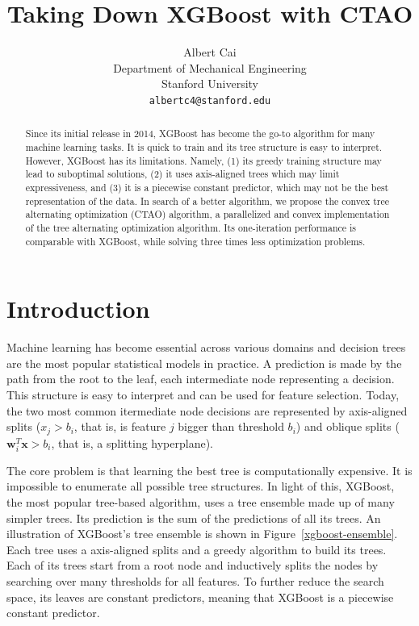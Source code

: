 \documentclass{article}
\title{Taking Down XGBoost with CTAO}
\author{%
  Albert Cai\\
  Department of Mechanical Engineering\\
  Stanford University\\
  \texttt{albertc4@stanford.edu} \\
}
\begin{document}
\maketitle


\begin{abstract}
  Since its initial release in 2014, XGBoost has become the go-to algorithm for many machine learning tasks.
  It is quick to train and its tree structure is easy to interpret. However, XGBoost has its limitations.
  Namely, (1) its greedy training structure may lead to suboptimal solutions, (2) it uses
  axis-aligned trees which may limit expressiveness, and (3) it is a
  piecewise constant predictor, which may not be the best representation of the data.
  In search of a better algorithm, we propose the convex tree alternating optimization (CTAO) algorithm, 
  a parallelized and convex implementation of the tree alternating optimization algorithm.
  Its one-iteration performance is comparable with XGBoost, while solving three times less optimization problems.
\end{abstract}


\section{Introduction}

Machine learning has become essential across various domains and decision trees are the most popular statistical models in practice.
A prediction is made by the path from the root to the leaf, each intermediate node representing a decision. 
This structure is easy to interpret and can be used for feature selection.
Today, the two most common itermediate node decisions are represented by 
axis-aligned splits ($x_j > b_i$, that is, is feature $j$ bigger than threshold $b_i$) and
oblique splits ($\mathbf{w}_i^T\mathbf{x} > b_i$, that is, a splitting hyperplane).

The core problem is that learning the best tree is computationally expensive. It is impossible to enumerate all possible tree structures.
In light of this, XGBoost, the most popular tree-based algorithm, uses a tree ensemble made up of many simpler trees. 
Its prediction is the sum of the predictions of all its trees. An illustration of XGBoost's tree ensemble is shown in Figure~\ref{xgboost-ensemble}.
Each tree uses a axis-aligned splits and a greedy algorithm to build its trees. 
Each of its trees start from a root node and inductively splits the nodes by searching over many thresholds for all features. To further
reduce the search space, its leaves are constant predictors, meaning that XGBoost is a piecewise constant predictor.
\end{document}
